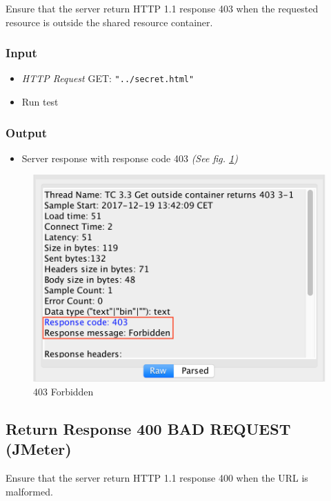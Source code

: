 \documentclass[a4paper, 12pt]{article}
\begin{document}
Ensure that the server return HTTP 1.1 response 403 when the requested resource is outside the shared resource container.

\subsubsection{Input}
\begin{itemize}
\item \textit{HTTP Request} GET: \texttt{"../secret.html"}
\item Run test
\end{itemize}

\subsubsection{Output}
\begin{itemize}
\item Server response with response code 403 \textit{(See fig. \ref{TC3.3})}
\end{itemize}

\begin{figure}[H]
\centering
\includegraphics[scale=0.7]{output_clarification/403FORBIDDEN.png} 
\caption{403 Forbidden}
\label{TC3.3}
\end{figure}

\subsection{Return Response 400 BAD REQUEST (JMeter)}

Ensure that the server return HTTP 1.1 response 400 when the URL is malformed.
\end{document}
